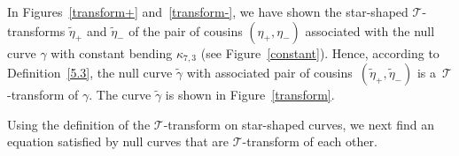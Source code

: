\documentclass[10pt,a4paper]{amsart}
\numberwithin{equation}{section}
\def\bending{\kappa}
\begin{document}
\begin{Remark}
	In Figures~\ref{transform+} and~\ref{transform-}, we have shown the star-shaped $\mathcal{T}$-transforms $\widetilde{\eta}_+$ and $\widetilde{\eta}_-$ of the pair of cousins $(\eta_+,\eta_-)$ associated with the null curve $\gamma$ with constant bending $\bending_{7,3}$ (see Figure~\ref{constant}). Hence, according to Definition~\ref{5.3}, the null curve $\widetilde{\gamma}$ with associated pair of cousins~$(\widetilde{\eta}_+,\widetilde{\eta}_-)$ is a~$\mathcal{T}$-transform of $\gamma$. The curve $\widetilde{\gamma}$ is shown in Figure~\ref{transform}.
\end{Remark}

Using the definition of the $\mathcal{T}$-transform on star-shaped curves, we next find an equation satisfied by null curves that are $\mathcal{T}$-transform of each other.
\end{document}
